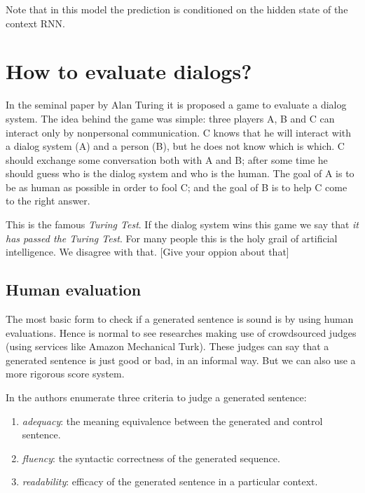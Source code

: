 Note that in this model the prediction is conditioned on the hidden state of the context RNN.


\section{How to evaluate dialogs?}

\label{ch:03-eval}

In the seminal paper by Alan Turing \cite{Turing} it is proposed a game to evaluate a dialog system. The idea behind the game was simple: three players A, B and C can interact only by nonpersonal communication. C knows that he will interact with a dialog system (A) and a person (B), but he does not know which is which. C should exchange some conversation both with A and B; after some time he should guess who is the dialog system and who is the human. The goal of A is to be as human as possible in order to fool C; and the goal of B is to help C come to the right answer.

\par This is the famous \textit{Turing Test}. If the dialog system wins this game we say that \textit{it has passed the Turing Test}. For many people this is the holy grail of artificial intelligence. We disagree with that. [Give your oppion about that]


\subsection{Human evaluation}

The most basic form to check if a generated sentence is sound is by using human evaluations. Hence is normal to see researches making use of crowdsourced judges (using services like Amazon Mechanical Turk). These judges can say that a generated sentence is just good or bad, in an informal way. But we can also use a more rigorous score system. 


In \cite{Stent} the authors enumerate three criteria to judge a generated sentence:

\begin{enumerate}
\item \textit{adequacy}: the meaning equivalence between the generated and control sentence. 
\item \textit{fluency}: the syntactic correctness of the generated sequence.
\item \textit{readability}: efficacy of the generated sentence in a particular context.
\end{enumerate}



